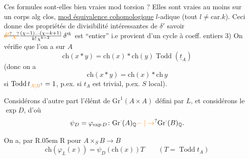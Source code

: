 Ces formules sont-elles bien vraies mod torsion ? Elles sont vraies au moins sur un corps alg clos, \uline{mod \uline{équivalence} cohomologique} $l$-adique (tout $l\ne\mathrm{car}.k$). Ceci donne des \margin{!} propriétés de divisibilité intéressantes de $\delta'$ savoir $\deleted{\unsure{\delta'}}\deleted{\unsure{\chi}}\frac{(\chi-1)\ldots(\chi-k+1)}{k!\,\chi^{k-2}}\,\delta'^{k}$ est ``entier'' i.e provient d'un cycle à coeff. entiers
3) On vérifie  que l'on a sur $A$
\[
\mathrm{ch}(x*y)=\mathrm{ch}(x)*\mathrm{ch}(y)\operatorname{Todd}(\underline t_A)\tag*{$(*)$}
\]
(donc on a
\[
\mathrm{ch}(x*y)=\mathrm{ch}(x)*\mathrm{ch}\,y
\]
si $\operatorname{Todd}t_{\unsure{A|B}}=1$, p.ex. si $t_A$ est trivial, p.ex. $S$ local).

Considérons d'autre part l'élémt  de $\mathrm{Gr}^1(A\times A)$ défini par $L$, et considérons le $\exp D$, d'où
\[
\psi_D=\varphi_{\exp D}\colon\mathrm{Gr}^{\cdot}(A)_{\mathbb Q}\unsure{\mathrel{-}|\to}\mathrm{Gr}^{\cdot}(B)_{\mathbb Q}.
\]


 On a, par R\kern.05em R pour $A\times_S B\longrightarrow B$
\[
\mathrm{ch}(\varphi_L(x))=\psi_D(\mathrm{ch}(x))T\qquad (T=\operatorname{Todd}t_A)
\]
  

